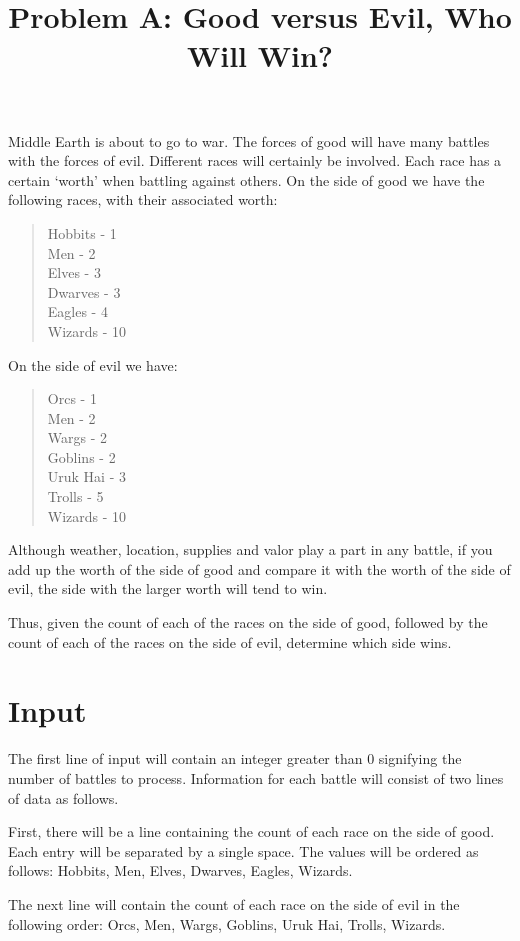 \documentclass{article}
\title{Problem A: Good versus Evil, Who Will Win?  }
\date{}
\begin{document}
\maketitle

Middle Earth is about to go to war.  The forces of good will have many
battles with the forces of evil.  Different races will certainly be involved.
Each race has a certain `worth' when battling against others.  
On the side of good we have the following races, with their associated
worth:
\begin{quote}
Hobbits - 1 \\
Men - 2 \\
Elves - 3 \\
Dwarves - 3 \\
Eagles - 4 \\
Wizards - 10 
\end{quote}
On the side of evil we have:
\begin{quote}
Orcs - 1 \\
Men - 2 \\
Wargs - 2 \\
Goblins - 2 \\
Uruk Hai - 3 \\
Trolls - 5 \\
Wizards - 10
\end{quote}

Although weather, location, supplies and valor play a part in any battle,
if you add up the worth of the side of good
and compare it with the worth of the side of evil, the side with the 
larger worth will tend to win.

Thus, given the count of each of the races on the side of good, 
followed by the count of each of the races on the side of evil,
determine which side wins.  

\section{Input}

The first line of input will contain an integer greater than 0 signifying
the number of battles to process.  Information for each battle will consist
of two lines of data as follows.

First, there will be a line containing the count of each race on
the side of good.  Each entry will be separated by a single space.  The
values will be ordered as follows: Hobbits, Men, Elves, Dwarves, Eagles,
Wizards.

The next line will contain the count of each race on the side of evil
in the following order: Orcs, Men, Wargs, Goblins, Uruk Hai, Trolls, Wizards.
\end{document}

